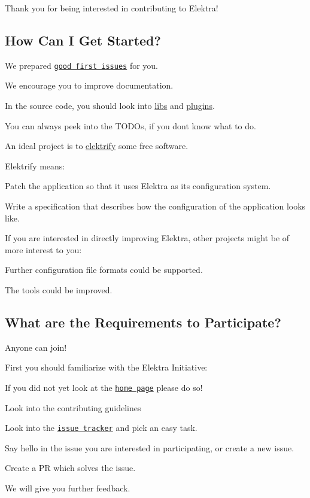 Thank you for being interested in contributing to Elektra!

\subsection*{How Can I Get Started?}

We prepared \href{https://github.com/ElektraInitiative/libelektra/issues?q=is%3Aissue+is%3Aopen+label%3A%22good+first+issue%22}{\tt good first issues} for you.


\begin{DoxyItemize}
\item We encourage you to improve documentation.
\item In the source code, you should look into \hyperlink{src_libs_README_md}{libs} and \hyperlink{src_plugins_README_md}{plugins}.
\item You can always peek into the T\+O\+D\+Os, if you don\textquotesingle{}t know what to do.
\item An ideal project is to \hyperlink{doc_help_elektra-glossary_md}{elektrify} some free software.
\end{DoxyItemize}

Elektrify means\+:


\begin{DoxyItemize}
\item Patch the application so that it uses Elektra as its configuration system.
\item Write a specification that describes how the configuration of the application looks like.
\end{DoxyItemize}

If you are interested in directly improving Elektra, other projects might be of more interest to you\+:


\begin{DoxyItemize}
\item Further configuration file formats could be supported.
\item The tools could be improved.
\end{DoxyItemize}

\subsection*{What are the Requirements to Participate?}

Anyone can join!

First you should familiarize with the Elektra Initiative\+:


\begin{DoxyItemize}
\item If you did not yet look at the \href{https://www.libelektra.org/}{\tt home page} please do so!
\item Look into the contributing guidelines
\item Look into the \href{https://issues.libelektra.org/}{\tt issue tracker} and pick an easy task.
\item Say hello in the issue you are interested in participating, or create a new issue.
\item Create a PR which solves the issue.
\item We will give you further feedback. 
\end{DoxyItemize}